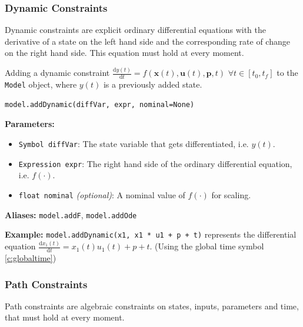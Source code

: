 \documentclass[12pt]{article}
\newcommand{\dd}{\mathrm{d}}
\renewcommand{\v}{\bm}
\begin{document}
\subsubsection{Dynamic Constraints}

Dynamic constraints are explicit ordinary differential equations with
the derivative of a state on the left hand side and the corresponding rate of
change on the right hand side. This equation must hold at every moment.

\begin{mdframed}[backgroundcolor=gray!10, roundcorner=10pt,
		linewidth=1pt]

	Adding a dynamic constraint $\frac{\dd y(t)}{\dd t} =
		f(\v{x}(t), \v{u}(t), \v{p}, t) \,\, \forall t \in [t_0, t_f]$ to
	the \texttt{Model}
	object, where $y(t)$ is a previously added state.

	\begin{lstlisting}
model.addDynamic(diffVar, expr, nominal=None)
		\end{lstlisting}
	\label{addDynamic}
	\textbf{Parameters:}
	\begin{itemize}
		\item \texttt{Symbol diffVar}: The state variable that
		      gets differentiated, i.e. $y(t)$.
		\item \texttt{Expression expr}: The right hand side of
		      the ordinary differential equation, i.e. $f(\cdot)$.
		\item \texttt{float nominal} \emph{(optional)}: A
		      nominal value of $f(\cdot)$ for scaling.
	\end{itemize}

	\textbf{Aliases:}  \texttt{model.addF}, \texttt{model.addOde}

	\textbf{Example:} \texttt{model.addDynamic(x1, x1 * u1 + p +
		t)} represents the differential equation
	$\frac{\dd x_1(t)}{\dd t} = x_1(t) u_1(t) + p + t$. (Using the
	global time symbol \eqref{c:globaltime})
\end{mdframed}

\subsubsection{Path Constraints}

Path constraints are algebraic constraints on states, inputs,
parameters and time, that must hold at every moment.
\end{document}
